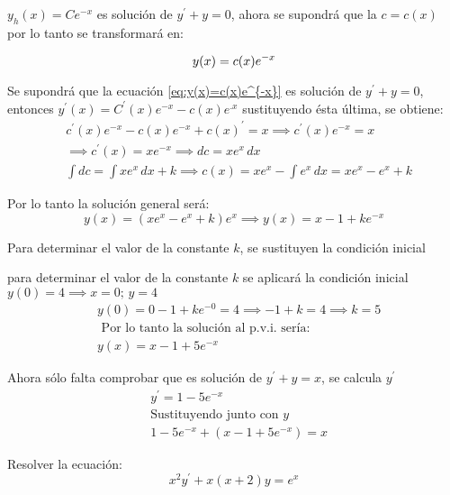 $y_h(x)=Ce^{-x}$ es solución de $y^{\prime}+y=0$, ahora se supondrá que la $c=c(x)$
por lo tanto se transformará en: 

\begin{equation}
    y(x)=c(x)e^{-x}
\label{eq:y(x)=c(x)e^{-x}}
\end{equation}

Se supondrá que la ecuación \eqref{eq:y(x)=c(x)e^{-x}} es solución de $y^{\prime}+y=0$, entonces $y^{\prime}(x)=C^{\prime}(x)e^{-x}-c(x)e^{.x}$
sustituyendo ésta última, se obtiene: 
\begin{align*}
    &c^{\prime}(x)e^{-x}-c(x)e^{-x}+c(x)^{\prime}=x\implies c^{\prime}(x)e^{-x}=x\\
    &\implies c^{\prime}(x)=xe^{-x}\implies dc=xe^x\, dx\\
    &\int dc=\int xe^x\, dx+k\implies c(x)=xe^x-\int e^x\, dx=xe^x-e^x+k
\end{align*}

Por lo tanto la solución general será:
\begin{equation*}
    y(x)=\left(xe^x-e^x+k\right)e^x\implies y(x)=x-1+ke^{-x}
\end{equation*}

Para determinar el valor de la constante $k$, se sustituyen la condición inicial

para determinar el valor de la constante $k$ se aplicará la condición inicial $y(0)=4\implies x=0;\, y=4$
\begin{align*}
    &y(0)=0-1+ke^{-0}=4\implies -1+k=4\implies k=5\\
    &\text{ Por lo tanto la solución al p.v.i. sería:}\\
    &y(x)=x-1+5e^{-x}
\end{align*}

Ahora sólo falta comprobar que es solución de $y^{\prime}+y=x$, se calcula $y^{\prime}$
\begin{align*}
    &y^{\prime}=1-5e^{-x}\\
    &\text{Sustituyendo junto con }y\\
    &1-5e^{-x}+(x-1+5e^{-x})=x
\end{align*}

\begin{example}
    Resolver la ecuación:
    \begin{equation}
        x^2y^{\prime}+x(x+2)y=e^x
        \label{eq:example1}
    \end{equation}
\end{example}

